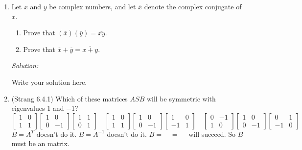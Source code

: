 \documentclass[11pt]{article}
\newenvironment{sol}
    {\emph{Solution:}
    }
\newcommand{\headings}{
\large{\textbf{YOUR NAME GOES HERE \hfill 21-241 Fall 2019}\\
\textbf{Homework 10 \hfill Due Friday, November 8}}\\
\rule[0.1in]{\textwidth}{0.01in}
}
\begin{document}
\headings



\begin{enumerate}
\section*{Required Problems}
\item Let $x$ and $y$ be complex numbers, and let $\overline{x}$ denote the complex conjugate of $x$. 
\begin{enumerate}
\item  Prove that $(\overline{x})(\overline{y}) = \overline{xy}$.
\item Prove that $\overline{x} + \overline{y} = \overline{x+y}$.
\end{enumerate}


 \begin{sol}
Write your solution here.
\end{sol}
\clearpage


\item (Strang 6.4.1) Which of these matrices $ASB$ will be symmetric with eigenvalues $1$ and $-1$?
\[ 
\begin{bmatrix} 1 & 0 \\ 1 & 1 \end{bmatrix} \begin{bmatrix} 1 & 0 \\ 0 & -1 \end{bmatrix} \begin{bmatrix} 1 & 1 \\ 0 & 1 \end{bmatrix} \quad
 \begin{bmatrix} 1 & 0 \\ 1 & 1 \end{bmatrix} \begin{bmatrix} 1 & 0 \\ 0 & -1 \end{bmatrix} \begin{bmatrix} 1 & 0 \\ -1 & 1 \end{bmatrix} \quad
  \begin{bmatrix} 0 & -1 \\ 1 & 0 \end{bmatrix} \begin{bmatrix} 1 & 0 \\ 0 & -1 \end{bmatrix} \begin{bmatrix} 0 & 1 \\ -1 & 0 \end{bmatrix}
\]
$B=A^T$ doesn't do it.  $B=A^{-1}$ doesn't do it. $B= \quad = \quad$ will succeed.  So $B$ must be an \hspace{1in} matrix.


\end{enumerate}
\end{document}
